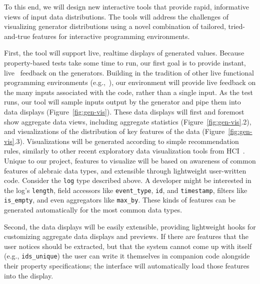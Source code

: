 To this end, we will design new interactive tools that provide rapid,
informative views of input data distributions. The tools will address the
challenges of visualizing generator distributions using a novel combination of
tailored, tried-and-true features for interactive programming environments.

First, the tool will support live, realtime displays of generated values.
Because property-based tests take some time to run, our first goal is to provide
instant, live~\cite{ref:tanimoto1990viva} feedback on the generators. Building
in the tradition of other live functional programming environments
(e.g.,~\cite{tool:lighttable,ref:omar2019live}), our environment will provide
live feedback on the many inputs associated with the code, rather than a single
input. As the test runs, our tool will sample inputs output by the generator and
pipe them into data displays (Figure~\ref{fig:gen-vis}). These data displays
will first and foremost show aggregate data views, including aggregate
statistics (Figure~\ref{fig:gen-vis}.2), and visualizations of the distribution
of key features of the data (Figure~\ref{fig:gen-vis}.3). Visualizations will be
generated according to simple recommendation rules, similarly to other recent
exploratory data visualization tools from
HCI~\cite{ref:lee2021lux,wongsuphasawat_voyager_2016,
wongsuphasawat_voyager_2017}. Unique to our project, features to visualize will
be based on awareness of common features of alebraic data types, and extensible
through lightweight user-written code. Consider the \lstinline{log} type
described above. A developer might be interested in the log's
\lstinline{length}, field accessors like \lstinline{event_type}, \lstinline{id},
and \lstinline{timestamp}, filters like \lstinline{is_empty}, and even
aggregators like \lstinline{max_by}. These kinds of features can be generated
automatically for the most common data types.

Second, the data displays will be easily extensible, providing lightweight hooks
for customizing aggregate data displays and previews. If
there are features that the user notices should be extracted, but that the
system cannot come up with itself (e.g., \lstinline{ids_unique}) the user can
write it themselves in companion code alongside their property specifications;
the interface will automatically load those features into the display.

